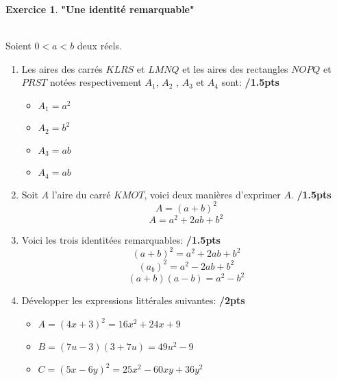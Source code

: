 \documentclass[a4paper,10.9pt]{article}
\theoremstyle{definition}
\newtheorem{exo}{Exercice}
\begin{document}
\begin{exo}\textbf{"Une identité remarquable"}\\\hfil\\
\begin{minipage}[c]{1.0\linewidth}

\noindent Soient $0< a < b$ deux réels.
\begin{enumerate}
\item Les aires des carrés $KLRS$ et $LMNQ$ et les aires des rectangles $NOPQ$ et $PRST$ notées respectivement $A_1$, $A_2$ , $A_3$ et $A_4$ sont:\hfill\textbf{ /1.5pts}\\
\begin{multicols}{2}
	\begin{itemize}
		\item $A_1 = a^2$
		\item $A_2 = b^2$
		\item $A_3 = ab$
		\item $A_4 = ab$
	\end{itemize}
\end{multicols}

\item Soit $A$ l'aire du carré $KMOT$, voici deux manières d'exprimer $A$.\hfill\textbf{ /1.5pts}
$$A = (a+b)^2$$
$$A = a^2+ 2ab +b^2$$
\item Voici les trois identitées remarquables: \hfill\textbf{ /1.5pts}
$$(a+b)^2 = a^2+ 2ab +b^2 $$
$$(a_b)^2 = a^2- 2ab +b^2 $$
$$(a+b)(a-b)= a^2 - b^2 $$

\item Développer les expressions littérales suivantes:\hfill\textbf{ /2pts}
\begin{itemize}[$\square$]
\item $A = (4x+3)^2 = 16x^2 +24x +9$
\item $B = (7u-3)(3+7u) = 49u^2 - 9$
\item $C = (5x-6y)^2 = 25x^2-60xy + 36y^2$\\
\end{itemize}
\end{enumerate}
\end{minipage}
\end{exo}
\end{document}
